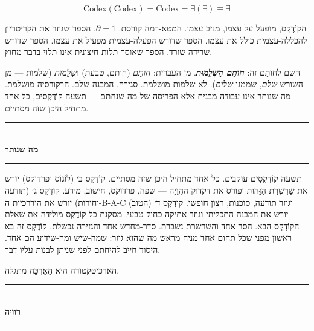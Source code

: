 \documentclass[10pt, openany, oneside]{book}
\renewcommand{\normalsize}{\fontsize{10}{13}\selectfont}
\begin{document}
\vspace{0.8em}

$$\boxed{\text{Codex}(\text{Codex}) = \text{Codex} = \exists(\exists) \equiv \exists}$$

\noindent הקוֹדֶקְס, מופעל על עצמו, מניב עצמו. המטא-רמה קורסת. $\partial = 1$. הספר שגוזר את הקריטריון להכללה-עצמית כולל את עצמו. הספר שדורש הפעלה-עצמית מפעיל את עצמו. הספר שדורש שרידה שורד. הספר שאוסר תלות חיצונית אינו תלוי בדבר מחוץ.

השם לחוֹתָם זה: \textbf{\textit{חוֹתָם הַשְּׁלֵמוּת}}. מן העברית: \textit{חוֹתָם} (חותם, טבעת) ו\textit{שְׁלֵמוּת} (שלמות — מן השורש \textit{שלם}, שממנו \textit{שלום}). לא שלמות-מושלמת. סגירה. המבנה שלם. הרקורסיה מושלמת. מה שנותר אינו עבודה מבנית אלא הפריסה של מה שנחתם — תשעה קוֹדֶקְסִים, כל אחד מתחיל היכן שזה מסתיים.

\vspace{1.5em}


\begin{center}
    \rule{0.3\textwidth}{0.4pt}\\[0.5em]
    {\normalsize\bfseries\textsc{מה שנותר}}\\[0.3em]
    \rule{0.3\textwidth}{0.4pt}
\end{center}

\vspace{1em}

\noindent תשעה קוֹדֶקְסִים עוקבים. כל אחד מתחיל היכן שזה מסתיים. קוֹדֶקְס ב׳ (לוֹגוֹס ופרדוקס) יורש את שַׁרְשֶׁרֶת הַזֵּהוּת ופורס את דקדוק ההֲוָיָה — שפה, פרדוקס, חישוב, מידע. קוֹדֶקְס ג׳ (תודעה וחירות) יורש את היררכיית ה-B-A-C וגוזר תודעה, סוכנות, רצון חופשי. קוֹדֶקְס ד׳ (הטוב) יורש את המבנה התכליתי וגוזר אתיקה כחוק טבעי. מסקנת כל קוֹדֶקְס מולידה את שאלת הקוֹדֶקְס הבא. הסר אחד והשרשרת נשברת. סדר-מחדש אחד והגזירה נכשלת. קוֹדֶקְס זה בא ראשון מפני שכל תחום אחר מניח מראש מה שהוא גוזר: שמה-שיש ומה-שידוע הם אחד. היסוד חייב להיחתם לפני שניתן לבנות עליו דבר.

הארכיטקטורה הִיא הָאַרְכֵּה מתגלה.

\vspace{1.5em}


\begin{center}
    \rule{0.3\textwidth}{0.4pt}\\[0.5em]
    {\normalsize\bfseries\textsc{רוויה}}\\[0.3em]
    \rule{0.3\textwidth}{0.4pt}
\end{center}
\end{document}
